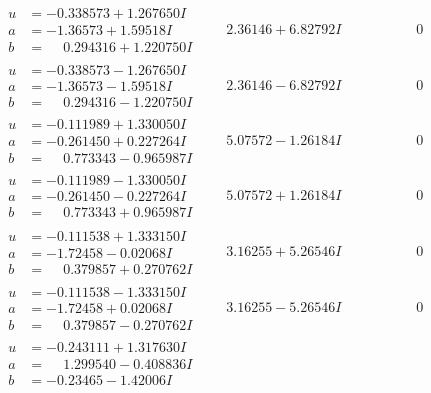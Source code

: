 \documentclass[1p]{elsarticle_modified}
\theoremstyle{definition}
\begin{document}
$$\begin{array}{c|c|c}
\begin{aligned}
u &= -0.338573 + 1.267650 I \\
a &= -1.36573 + 1.59518 I \\
b &= \phantom{-}0.294316 + 1.220750 I\end{aligned}
 & \phantom{-}2.36146 + 6.82792 I & \phantom{-0.000000 } 0 \\ \hline\begin{aligned}
u &= -0.338573 - 1.267650 I \\
a &= -1.36573 - 1.59518 I \\
b &= \phantom{-}0.294316 - 1.220750 I\end{aligned}
 & \phantom{-}2.36146 - 6.82792 I & \phantom{-0.000000 } 0 \\ \hline\begin{aligned}
u &= -0.111989 + 1.330050 I \\
a &= -0.261450 + 0.227264 I \\
b &= \phantom{-}0.773343 - 0.965987 I\end{aligned}
 & \phantom{-}5.07572 - 1.26184 I & \phantom{-0.000000 } 0 \\ \hline\begin{aligned}
u &= -0.111989 - 1.330050 I \\
a &= -0.261450 - 0.227264 I \\
b &= \phantom{-}0.773343 + 0.965987 I\end{aligned}
 & \phantom{-}5.07572 + 1.26184 I & \phantom{-0.000000 } 0 \\ \hline\begin{aligned}
u &= -0.111538 + 1.333150 I \\
a &= -1.72458 - 0.02068 I \\
b &= \phantom{-}0.379857 + 0.270762 I\end{aligned}
 & \phantom{-}3.16255 + 5.26546 I & \phantom{-0.000000 } 0 \\ \hline\begin{aligned}
u &= -0.111538 - 1.333150 I \\
a &= -1.72458 + 0.02068 I \\
b &= \phantom{-}0.379857 - 0.270762 I\end{aligned}
 & \phantom{-}3.16255 - 5.26546 I & \phantom{-0.000000 } 0 \\ \hline\begin{aligned}
u &= -0.243111 + 1.317630 I \\
a &= \phantom{-}1.299540 - 0.408836 I \\
b &= -0.23465 - 1.42006 I\end{aligned}

\end{array}$$
\end{document}

